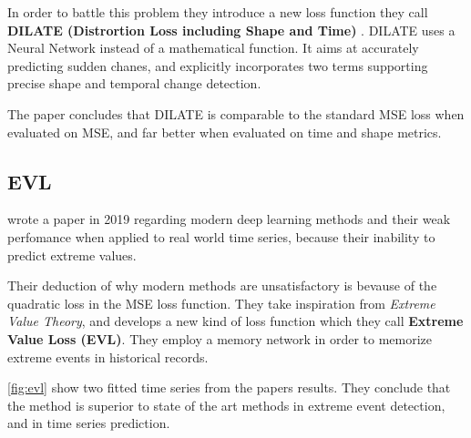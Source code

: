 In order to battle this problem they introduce a new loss function they call 
\textbf{DILATE (Distrortion Loss including Shape and Time)} \cite{Guen2019}.
DILATE uses a Neural Network instead of a mathematical function. 
It aims at accurately predicting sudden chanes, and explicitly incorporates two terms
supporting precise shape and temporal change detection.

The paper concludes that DILATE is comparable to the standard MSE loss when evaluated on MSE,
and far better when evaluated on time and shape metrics.


\subsection{EVL}
\citeauthor{Ding2019} wrote a paper in 2019 regarding modern deep learning methods and their
weak perfomance when applied to real world time series, because their inability to predict extreme values.

Their deduction of why modern methods are unsatisfactory is bevause of the quadratic loss in 
the MSE loss function.
They take inspiration from \textit{Extreme Value Theory}, and develops a new kind of loss function
which they call \textbf{Extreme Value Loss (EVL)}.
They employ a memory network in order to memorize extreme events in historical records.

\autoref{fig:evl} show two fitted time series from the papers results. They conclude
that the method is superior to state of the art methods in extreme event detection, and 
in time series prediction.

